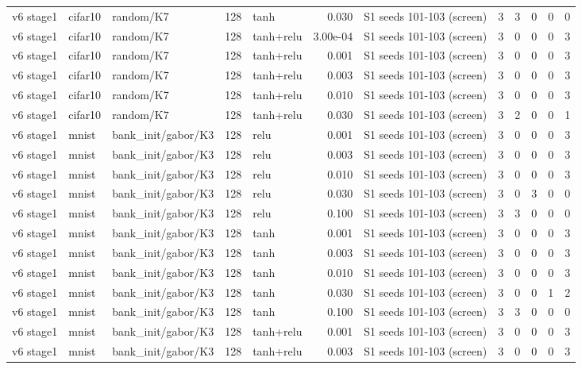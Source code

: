 \begin{table}[htbp]
{\begin{tabular}{@{}lllrlrlrrrrr@{}}
v6 stage1 & cifar10 & random/K7 & 128 & tanh & 0.030 & S1 seeds 101-103 (screen) & 3 & 3 & 0 & 0 & 0 \\
v6 stage1 & cifar10 & random/K7 & 128 & tanh+relu & 3.00e-04 & S1 seeds 101-103 (screen) & 3 & 0 & 0 & 0 & 3 \\
v6 stage1 & cifar10 & random/K7 & 128 & tanh+relu & 0.001 & S1 seeds 101-103 (screen) & 3 & 0 & 0 & 0 & 3 \\
v6 stage1 & cifar10 & random/K7 & 128 & tanh+relu & 0.003 & S1 seeds 101-103 (screen) & 3 & 0 & 0 & 0 & 3 \\
v6 stage1 & cifar10 & random/K7 & 128 & tanh+relu & 0.010 & S1 seeds 101-103 (screen) & 3 & 0 & 0 & 0 & 3 \\
v6 stage1 & cifar10 & random/K7 & 128 & tanh+relu & 0.030 & S1 seeds 101-103 (screen) & 3 & 2 & 0 & 0 & 1 \\
v6 stage1 & mnist & bank\_init/gabor/K3 & 128 & relu & 0.001 & S1 seeds 101-103 (screen) & 3 & 0 & 0 & 0 & 3 \\
v6 stage1 & mnist & bank\_init/gabor/K3 & 128 & relu & 0.003 & S1 seeds 101-103 (screen) & 3 & 0 & 0 & 0 & 3 \\
v6 stage1 & mnist & bank\_init/gabor/K3 & 128 & relu & 0.010 & S1 seeds 101-103 (screen) & 3 & 0 & 0 & 0 & 3 \\
v6 stage1 & mnist & bank\_init/gabor/K3 & 128 & relu & 0.030 & S1 seeds 101-103 (screen) & 3 & 0 & 3 & 0 & 0 \\
v6 stage1 & mnist & bank\_init/gabor/K3 & 128 & relu & 0.100 & S1 seeds 101-103 (screen) & 3 & 3 & 0 & 0 & 0 \\
v6 stage1 & mnist & bank\_init/gabor/K3 & 128 & tanh & 0.001 & S1 seeds 101-103 (screen) & 3 & 0 & 0 & 0 & 3 \\
v6 stage1 & mnist & bank\_init/gabor/K3 & 128 & tanh & 0.003 & S1 seeds 101-103 (screen) & 3 & 0 & 0 & 0 & 3 \\
v6 stage1 & mnist & bank\_init/gabor/K3 & 128 & tanh & 0.010 & S1 seeds 101-103 (screen) & 3 & 0 & 0 & 0 & 3 \\
v6 stage1 & mnist & bank\_init/gabor/K3 & 128 & tanh & 0.030 & S1 seeds 101-103 (screen) & 3 & 0 & 0 & 1 & 2 \\
v6 stage1 & mnist & bank\_init/gabor/K3 & 128 & tanh & 0.100 & S1 seeds 101-103 (screen) & 3 & 3 & 0 & 0 & 0 \\
v6 stage1 & mnist & bank\_init/gabor/K3 & 128 & tanh+relu & 0.001 & S1 seeds 101-103 (screen) & 3 & 0 & 0 & 0 & 3 \\
v6 stage1 & mnist & bank\_init/gabor/K3 & 128 & tanh+relu & 0.003 & S1 seeds 101-103 (screen) & 3 & 0 & 0 & 0 & 3 \\

\end{tabular}}
\end{table}

